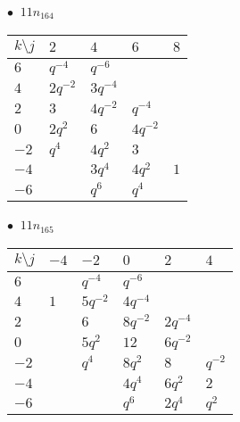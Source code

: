 %
\begin{minipage}{\linewidth}
$\bullet\ $ $11n_{164}$ \vspace{0.5em} \\
\begin{tabular}{l|llll}
$k \setminus j$ & $2$ & $4$ & $6$ & $8$ \\
\hline
$6$ & $q^{-4}$ & $q^{-6}$ &  &  \\
$4$ & $2q^{-2}$ & $3q^{-4}$ &  &  \\
$2$ & $3$ & $4q^{-2}$ & $q^{-4}$ &  \\
$0$ & $2q^{2}$ & $6$ & $4q^{-2}$ &  \\
$-2$ & $q^{4}$ & $4q^{2}$ & $3$ &  \\
$-4$ &  & $3q^{4}$ & $4q^{2}$ & $1$ \\
$-6$ &  & $q^{6}$ & $q^{4}$ &  \\
\end{tabular}
\vspace{2em}
\end{minipage}
%
\begin{minipage}{\linewidth}
$\bullet\ $ $11n_{165}$ \vspace{0.5em} \\
\begin{tabular}{l|lllll}
$k \setminus j$ & $-4$ & $-2$ & $0$ & $2$ & $4$ \\
\hline
$6$ &  & $q^{-4}$ & $q^{-6}$ &  &  \\
$4$ & $1$ & $5q^{-2}$ & $4q^{-4}$ &  &  \\
$2$ &  & $6$ & $8q^{-2}$ & $2q^{-4}$ &  \\
$0$ &  & $5q^{2}$ & $12$ & $6q^{-2}$ &  \\
$-2$ &  & $q^{4}$ & $8q^{2}$ & $8$ & $q^{-2}$ \\
$-4$ &  &  & $4q^{4}$ & $6q^{2}$ & $2$ \\
$-6$ &  &  & $q^{6}$ & $2q^{4}$ & $q^{2}$ \\
\end{tabular}
\vspace{2em}
\end{minipage}
%
